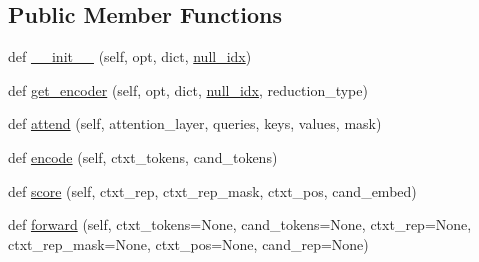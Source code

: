 \subsection*{Public Member Functions}
\begin{DoxyCompactItemize}
\item 
def \hyperlink{classparlai_1_1agents_1_1transformer_1_1polyencoder_1_1PolyEncoderModule_acf6f1b0dd5025b20c330d08bd2a13755}{\+\_\+\+\_\+init\+\_\+\+\_\+} (self, opt, dict, \hyperlink{classparlai_1_1agents_1_1transformer_1_1polyencoder_1_1PolyEncoderModule_a7a029490f5786bfa0fb2755e716118e4}{null\+\_\+idx})
\item 
def \hyperlink{classparlai_1_1agents_1_1transformer_1_1polyencoder_1_1PolyEncoderModule_acd213717123d2f2f24e6f03270c3db14}{get\+\_\+encoder} (self, opt, dict, \hyperlink{classparlai_1_1agents_1_1transformer_1_1polyencoder_1_1PolyEncoderModule_a7a029490f5786bfa0fb2755e716118e4}{null\+\_\+idx}, reduction\+\_\+type)
\item 
def \hyperlink{classparlai_1_1agents_1_1transformer_1_1polyencoder_1_1PolyEncoderModule_a21343cb181ee148326166a8e32e9e3d6}{attend} (self, attention\+\_\+layer, queries, keys, values, mask)
\item 
def \hyperlink{classparlai_1_1agents_1_1transformer_1_1polyencoder_1_1PolyEncoderModule_a54ca3cb24e2a0fbbfa7b3f145c7558ed}{encode} (self, ctxt\+\_\+tokens, cand\+\_\+tokens)
\item 
def \hyperlink{classparlai_1_1agents_1_1transformer_1_1polyencoder_1_1PolyEncoderModule_a52218a8c0594ff4d5bf8e666dc38f508}{score} (self, ctxt\+\_\+rep, ctxt\+\_\+rep\+\_\+mask, ctxt\+\_\+pos, cand\+\_\+embed)
\item 
def \hyperlink{classparlai_1_1agents_1_1transformer_1_1polyencoder_1_1PolyEncoderModule_a9e769210d947e88dc3e4555583b9c82e}{forward} (self, ctxt\+\_\+tokens=None, cand\+\_\+tokens=None, ctxt\+\_\+rep=None, ctxt\+\_\+rep\+\_\+mask=None, ctxt\+\_\+pos=None, cand\+\_\+rep=None)
\end{DoxyCompactItemize}
